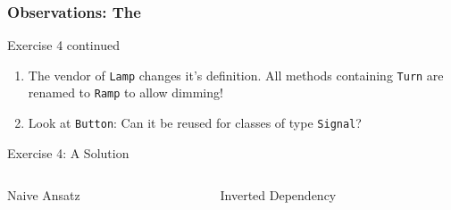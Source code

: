 \documentclass[9pt,handout]{beamer}
\begin{document}
\begin{frame}
  \frametitle{Observations: The \secname}
\begin{exampleblock}{Exercise 4 continued}
  \begin{enumerate}
  \item The vendor of \texttt{Lamp} changes it's definition. All methods containing \texttt{Turn} are renamed to \texttt{Ramp} to allow dimming!
  \item Look at \texttt{Button}: Can it be reused for classes of type \texttt{Signal}?
  \end{enumerate}
\end{exampleblock}
\pause
\begin{exampleblock}{Exercise 4: A Solution}
  \begin{columns}[t]

    \begin{column}{.45\textwidth}
       \begin{block}{Naive Ansatz}

          \begin{center}
          \end{center}
       \end{block}
    \end{column}

    \begin{column}{.45\textwidth}
       \begin{block}{Inverted Dependency}
       \begin{center}
       \end{center}
      \end{block}
    \end{column}


\end{columns}
\end{exampleblock}
\end{frame}
\end{document}
